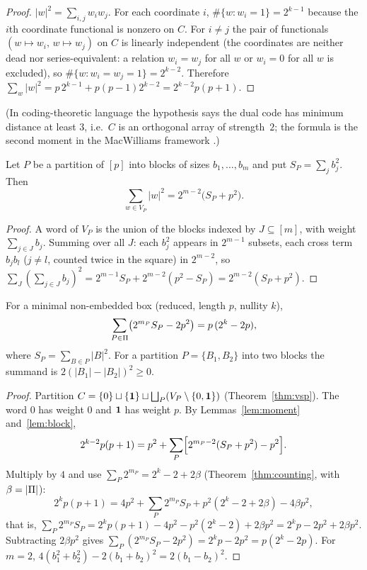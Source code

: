 \begin{proof}
$|w|^2=\sum_{i,j}w_iw_j$. For each coordinate $i$, $\#\{w: w_i=1\}=2^{k-1}$ because the $i$th coordinate functional is nonzero on $C$. For $i\ne j$ the pair of functionals $(w\mapsto w_i,\,w\mapsto w_j)$ on $C$ is linearly independent (the coordinates are neither dead nor series-equivalent: a relation $w_i=w_j$ for all $w$ or $w_i=0$ for all $w$ is excluded), so $\#\{w:w_i=w_j=1\}=2^{k-2}$. Therefore $\sum_w|w|^2=p\,2^{k-1}+p(p-1)2^{k-2}=2^{k-2}p(p+1)$.
\end{proof}

(In coding-theoretic language the hypothesis says the dual code has minimum distance at least $3$, i.e.\ $C$ is an orthogonal array of strength~$2$; the formula is the second moment in the MacWilliams framework \cite{MacWilliamsSloane1977}.)

\begin{lemma}\label{lem:block}
Let $P$ be a partition of $[p]$ into blocks of sizes $b_1,\dots,b_m$ and put $S_P=\sum_jb_j^2$. Then
\[
\sum_{w\in V_P}|w|^2=2^{m-2}\bigl(S_P+p^2\bigr).
\]
\end{lemma}

\begin{proof}
A word of $V_P$ is the union of the blocks indexed by $J\subseteq[m]$, with weight $\sum_{j\in J}b_j$. Summing over all $J$: each $b_j^2$ appears in $2^{m-1}$ subsets, each cross term $b_jb_l$ ($j\ne l$, counted twice in the square) in $2^{m-2}$, so $\sum_J(\sum_{j\in J}b_j)^2=2^{m-1}S_P+2^{m-2}(p^2-S_P)=2^{m-2}(S_P+p^2)$.
\end{proof}

\begin{theorem}\label{thm:parseval}
For a minimal non-embedded box (reduced, length $p$, nullity $k$),
\[
\sum_{P\in\Pi}\bigl(2^{m_P}S_P-2p^2\bigr)=p\,(2^k-2p),
\]
where $S_P=\sum_{B\in P}|B|^2$. For a partition $P=\{B_1,B_2\}$ into two blocks the summand is $2(|B_1|-|B_2|)^2\ge0$.
\end{theorem}

\begin{proof}
Partition $C=\{0\}\sqcup\{\mathbf 1\}\sqcup\bigsqcup_P(V_P\setminus\{0,\mathbf 1\})$ (Theorem~\ref{thm:vsp}). The word $0$ has weight $0$ and $\mathbf 1$ has weight $p$. By Lemmas~\ref{lem:moment} and~\ref{lem:block},
\[
2^{k-2}p(p+1)=p^2+\sum_P\Bigl[2^{m_P-2}(S_P+p^2)-p^2\Bigr].
\]
Multiply by $4$ and use $\sum_P 2^{m_P}=2^k-2+2\beta$ (Theorem~\ref{thm:counting}, with $\beta=|\Pi|$):
\[
2^kp(p+1)=4p^2+\sum_P2^{m_P}S_P+p^2(2^k-2+2\beta)-4\beta p^2,
\]
that is, $\sum_P2^{m_P}S_P=2^kp(p+1)-4p^2-p^2(2^k-2)+2\beta p^2=2^kp-2p^2+2\beta p^2$. Subtracting $2\beta p^2$ gives $\sum_P(2^{m_P}S_P-2p^2)=2^kp-2p^2=p(2^k-2p)$. For $m=2$, $4(b_1^2+b_2^2)-2(b_1+b_2)^2=2(b_1-b_2)^2$.
\end{proof}


